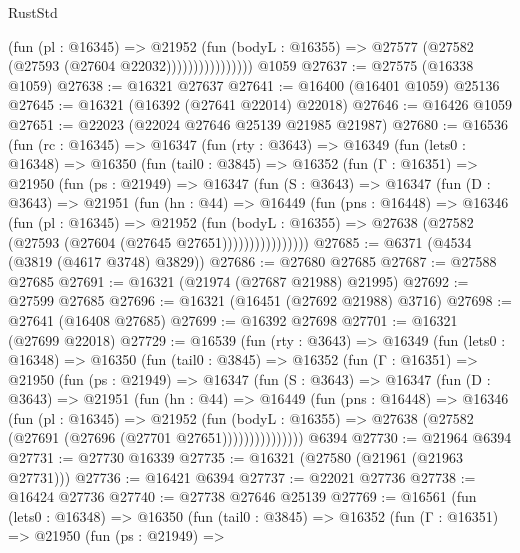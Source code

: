 \begin{lexlean}{RustStd}
\begin{coremodule}
                          (fun (pl : @16345) =>
                          @21952
                            (fun (bodyL : @16355) =>
                            @27577 (@27582 (@27593 (@27604 @22032))))))))))))))))
    @1059
@27637 := @27575 (@16338 @1059)
@27638 := @16321 @27637
@27641 := @16400 (@16401 @1059) @25136
@27645 := @16321 (@16392 (@27641 @22014) @22018)
@27646 := @16426 @1059
@27651 := @22023 (@22024 @27646 @25139 @21985 @21987)
@27680 := @16536
    (fun (rc : @16345) =>
    @16347
      (fun (rty : @3643) =>
      @16349
        (fun (lets0 : @16348) =>
        @16350
          (fun (tail0 : @3845) =>
          @16352
            (fun (Γ : @16351) =>
            @21950
              (fun (ps : @21949) =>
              @16347
                (fun (S : @3643) =>
                @16347
                  (fun (D : @3643) =>
                  @21951
                    (fun (hn : @44) =>
                    @16449
                      (fun (pns : @16448) =>
                      @16346
                        (fun (pl : @16345) =>
                        @21952
                          (fun (bodyL : @16355) =>
                          @27638 (@27582 (@27593 (@27604 (@27645 @27651))))))))))))))))
@27685 := @6371 (@4534 (@3819 (@4617 @3748) @3829))
@27686 := @27680 @27685
@27687 := @27588 @27685
@27691 := @16321 (@21974 (@27687 @21988) @21995)
@27692 := @27599 @27685
@27696 := @16321 (@16451 (@27692 @21988) @3716)
@27698 := @27641 (@16408 @27685)
@27699 := @16392 @27698
@27701 := @16321 (@27699 @22018)
@27729 := @16539
    (fun (rty : @3643) =>
    @16349
      (fun (lets0 : @16348) =>
      @16350
        (fun (tail0 : @3845) =>
        @16352
          (fun (Γ : @16351) =>
          @21950
            (fun (ps : @21949) =>
            @16347
              (fun (S : @3643) =>
              @16347
                (fun (D : @3643) =>
                @21951
                  (fun (hn : @44) =>
                  @16449
                    (fun (pns : @16448) =>
                    @16346
                      (fun (pl : @16345) =>
                      @21952
                        (fun (bodyL : @16355) =>
                        @27638 (@27582 (@27691 (@27696 (@27701 @27651)))))))))))))))
    @6394
@27730 := @21964 @6394
@27731 := @27730 @16339
@27735 := @16321 (@27580 (@21961 (@21963 @27731)))
@27736 := @16421 @6394
@27737 := @22021 @27736
@27738 := @16424 @27736
@27740 := @27738 @27646 @25139
@27769 := @16561
    (fun (lets0 : @16348) =>
    @16350
      (fun (tail0 : @3845) =>
      @16352
        (fun (Γ : @16351) =>
        @21950
          (fun (ps : @21949) =>

\end{coremodule}
\end{lexlean}
